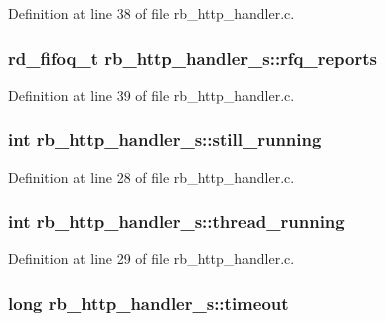 Definition at line 38 of file rb\-\_\-http\-\_\-handler.\-c.

\hypertarget{structrb__http__handler__s_a383f2047cfcdd9fe49d0deacf770a73c}{
\subsubsection[{rfq\-\_\-reports}]{\setlength{\rightskip}{0pt plus 5cm}rd\-\_\-fifoq\-\_\-t rb\-\_\-http\-\_\-handler\-\_\-s\-::rfq\-\_\-reports}}\label{structrb__http__handler__s_a383f2047cfcdd9fe49d0deacf770a73c}


Definition at line 39 of file rb\-\_\-http\-\_\-handler.\-c.

\hypertarget{structrb__http__handler__s_aa49e97bedda03106912088dad0b75e64}{
\subsubsection[{still\-\_\-running}]{\setlength{\rightskip}{0pt plus 5cm}int rb\-\_\-http\-\_\-handler\-\_\-s\-::still\-\_\-running}}\label{structrb__http__handler__s_aa49e97bedda03106912088dad0b75e64}


Definition at line 28 of file rb\-\_\-http\-\_\-handler.\-c.

\hypertarget{structrb__http__handler__s_a978656c7c89a80d411121107c97a0dcd}{
\subsubsection[{thread\-\_\-running}]{\setlength{\rightskip}{0pt plus 5cm}int rb\-\_\-http\-\_\-handler\-\_\-s\-::thread\-\_\-running}}\label{structrb__http__handler__s_a978656c7c89a80d411121107c97a0dcd}


Definition at line 29 of file rb\-\_\-http\-\_\-handler.\-c.

\hypertarget{structrb__http__handler__s_a619a5777839d378f50240c703558b4a8}{
\subsubsection[{timeout}]{\setlength{\rightskip}{0pt plus 5cm}long rb\-\_\-http\-\_\-handler\-\_\-s\-::timeout}}\label{structrb__http__handler__s_a619a5777839d378f50240c703558b4a8}


